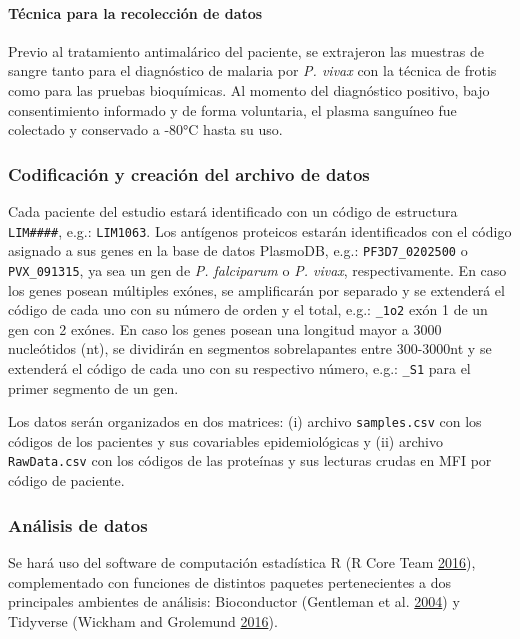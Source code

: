 \documentclass[
  a4paper]{article}
\let\oldparagraph\paragraph
\renewcommand{\paragraph}[1]{\oldparagraph{#1}\mbox{}}
\begin{document}
\hypertarget{tuxe9cnica-para-la-recolecciuxf3n-de-datos}{%
\paragraph{Técnica para la recolección de
datos}\label{tuxe9cnica-para-la-recolecciuxf3n-de-datos}}

Previo al tratamiento antimalárico del paciente, se extrajeron las
muestras de sangre tanto para el diagnóstico de malaria por \emph{P.
vivax} con la técnica de frotis como para las pruebas bioquímicas. Al
momento del diagnóstico positivo, bajo consentimiento informado y de
forma voluntaria, el plasma sanguíneo fue colectado y conservado a -80°C
hasta su uso.

\hypertarget{codificaciuxf3n-y-creaciuxf3n-del-archivo-de-datos}{%
\subsubsection{Codificación y creación del archivo de
datos}\label{codificaciuxf3n-y-creaciuxf3n-del-archivo-de-datos}}

Cada paciente del estudio estará identificado con un código de
estructura \texttt{LIM\#\#\#\#}, e.g.: \texttt{LIM1063}. Los antígenos
proteicos estarán identificados con el código asignado a sus genes en la
base de datos PlasmoDB, e.g.: \texttt{PF3D7\_0202500} o
\texttt{PVX\_091315}, ya sea un gen de \emph{P. falciparum} o \emph{P.
vivax}, respectivamente. En caso los genes posean múltiples exónes, se
amplificarán por separado y se extenderá el código de cada uno con su
número de orden y el total, e.g.: \texttt{\_1o2} exón 1 de un gen con 2
exónes. En caso los genes posean una longitud mayor a 3000 nucleótidos
(nt), se dividirán en segmentos sobrelapantes entre 300-3000nt y se
extenderá el código de cada uno con su respectivo número, e.g.:
\texttt{\_S1} para el primer segmento de un gen.

Los datos serán organizados en dos matrices: (i) archivo
\texttt{samples.csv} con los códigos de los pacientes y sus covariables
epidemiológicas y (ii) archivo \texttt{RawData.csv} con los códigos de
las proteínas y sus lecturas crudas en MFI por código de paciente.

\hypertarget{anadata}{%
\subsubsection{Análisis de datos}\label{anadata}}

Se hará uso del software de computación estadística R (R Core Team
\protect\hyperlink{ref-R2016}{2016}), complementado con funciones de
distintos paquetes pertenecientes a dos principales ambientes de
análisis: Bioconductor (Gentleman et al.
\protect\hyperlink{ref-bioconductor2004}{2004}) y Tidyverse (Wickham and
Grolemund \protect\hyperlink{ref-wickham2016r4ds}{2016}).
\end{document}
